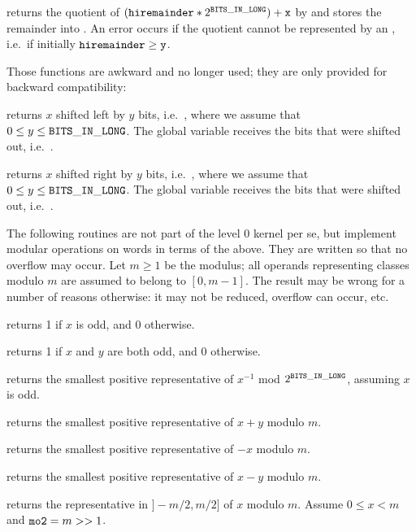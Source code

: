  returns the quotient of
$  \left({\tt hiremainder} * 2^{{\tt BITS\_IN\_LONG}}\right) + {\tt x} $
by  and stores the remainder into . An error occurs
if the quotient cannot be represented by an , i.e.~if initially
${\tt hiremainder}\ge{\tt y}$.

 Those functions are awkward and no longer used; they
are only provided for backward compatibility:

 returns $x$ shifted left by $y$ bits,
i.e.~, where we assume that $0\leq y\leq{\tt BITS\_IN\_LONG}$. The global variable
 receives the bits that were shifted out,
i.e.~.

 returns $x$ shifted right by $y$ bits,
i.e.~, where we assume that $0\leq y\leq{\tt BITS\_IN\_LONG}$. The global variable
 receives the bits that were shifted out,
i.e.~.

The following routines are not part of the level 0 kernel per se, but
implement modular operations on words in terms of the above. They are written
so that no overflow may occur. Let $m \geq 1$ be the modulus; all operands
representing classes modulo $m$ are assumed to belong to $[0,m-1]$. The
result may be wrong for a number of reasons otherwise: it may not be reduced,
overflow can occur, etc.

 returns 1 if $x$ is odd, and 0 otherwise.

 returns 1 if $x$ and $y$ are both odd,
and 0 otherwise.

 returns the smallest
positive representative of $x^{-1}$ mod $2^{\tt BITS\_IN\_LONG}$, assuming $x$ is odd.

 returns the smallest
positive representative of $x + y$ modulo $m$.

 returns the smallest
positive representative of $-x$ modulo $m$.

 returns the smallest
positive representative of $x - y$ modulo $m$.

 returns the representative
in $]-m/2,m/2]$ of $x$ modulo $m$. Assume $0 \leq x < m$ and
${\tt mo2}  = m >> 1$.

